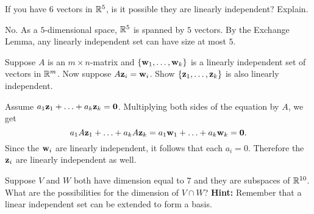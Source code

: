 \begin{enumialphparenastyle}
\begin{ex}
  If you have $6$ vectors in $\mathbb{R}^{5}$, is it possible they are
  linearly independent? Explain.
  \begin{sol}
    No. As a $5$-dimensional space, $\mathbb{R}^5$ is spanned by $5$
    vectors. By the Exchange Lemma, any linearly independent set can
    have size at most $5$.
  \end{sol}
\end{ex}

\begin{ex}
  Suppose $A$ is an $m\times n$-matrix and
  $\left\{\mbox{\bf w} _{1},\ldots,\mbox{\bf w}_{k}\right\}$ is a linearly independent
  set of vectors in $\mathbb{R}^{m}$. Now suppose
  $A\mbox{\bf z}_{i}=\mbox{\bf w}_{i}$. Show
  $\left\{ \mbox{\bf z}_{1},\ldots,\mbox{\bf z}_{k}\right\}$ is also linearly
  independent.
  \begin{sol}
    Assume
    $a_{1}\mbox{\bf z}_{1}+\ldots+a_{k}\mbox{\bf z}_{k}=\mbox{\bf 0}$. Multiplying
    both sides of the equation by $A$, we get
    \begin{equation*}
      a_{1}A\mbox{\bf z}_{1}+\ldots+a_{k}A\mbox{\bf z}_{k}=
      a_{1}\mbox{\bf w}_{1}+\ldots+a_{k}\mbox{\bf w}_{k}=\mbox{\bf 0}.
    \end{equation*}
    Since the $\mbox{\bf w}_{i}$ are linearly independent, it follows that
    each $a_{i}=0$. Therefore the $\mbox{\bf z}_{i}$ are linearly
    independent as well.
  \end{sol}
\end{ex}

\begin{ex}
  Suppose $V$ and $W$ both have dimension equal to $7$ and they are
  subspaces of $\mathbb{R}^{10}$. What are the possibilities for the dimension
  of $V\cap W$? \textbf{Hint:} Remember that a linear independent set can be
  extended to form a basis.
\end{ex}


\end{enumialphparenastyle}
